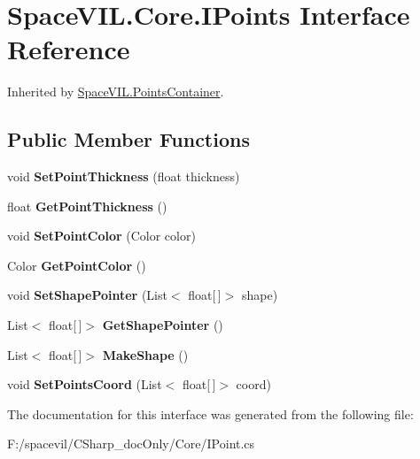 \hypertarget{interface_space_v_i_l_1_1_core_1_1_i_points}{}\section{Space\+V\+I\+L.\+Core.\+I\+Points Interface Reference}
\label{interface_space_v_i_l_1_1_core_1_1_i_points}


Inherited by \mbox{\hyperlink{class_space_v_i_l_1_1_points_container}{Space\+V\+I\+L.\+Points\+Container}}.

\subsection*{Public Member Functions}
\begin{DoxyCompactItemize}
\item 
\mbox{\label{interface_space_v_i_l_1_1_core_1_1_i_points_aceddbf8010ca2bf5749b1568338d8cbe}} 
void {\bfseries Set\+Point\+Thickness} (float thickness)
\item 
\mbox{\label{interface_space_v_i_l_1_1_core_1_1_i_points_a7c12ce35e77fdaa9411f2b268dd952fb}} 
float {\bfseries Get\+Point\+Thickness} ()
\item 
\mbox{\label{interface_space_v_i_l_1_1_core_1_1_i_points_a14b34f813fa022b8012debd8ce4cd90c}} 
void {\bfseries Set\+Point\+Color} (Color color)
\item 
\mbox{\label{interface_space_v_i_l_1_1_core_1_1_i_points_aa68b7d992f67dec150cf4dddcfd714fb}} 
Color {\bfseries Get\+Point\+Color} ()
\item 
\mbox{\label{interface_space_v_i_l_1_1_core_1_1_i_points_a4023971bd1864a861d8c44ee0d8f7095}} 
void {\bfseries Set\+Shape\+Pointer} (List$<$ float\mbox{[}$\,$\mbox{]}$>$ shape)
\item 
\mbox{\label{interface_space_v_i_l_1_1_core_1_1_i_points_a264c082aacca04f7b45049ceecac7876}} 
List$<$ float\mbox{[}$\,$\mbox{]}$>$ {\bfseries Get\+Shape\+Pointer} ()
\item 
\mbox{\label{interface_space_v_i_l_1_1_core_1_1_i_points_a81156696dec6126fc316641f36c41eca}} 
List$<$ float\mbox{[}$\,$\mbox{]}$>$ {\bfseries Make\+Shape} ()
\item 
\mbox{\label{interface_space_v_i_l_1_1_core_1_1_i_points_a21e6a7cec6c1eecc7c9b7a9eb8c8383e}} 
void {\bfseries Set\+Points\+Coord} (List$<$ float\mbox{[}$\,$\mbox{]}$>$ coord)
\end{DoxyCompactItemize}


The documentation for this interface was generated from the following file\+:\begin{DoxyCompactItemize}
\item 
F\+:/spacevil/\+C\+Sharp\+\_\+doc\+Only/\+Core/I\+Point.\+cs\end{DoxyCompactItemize}
